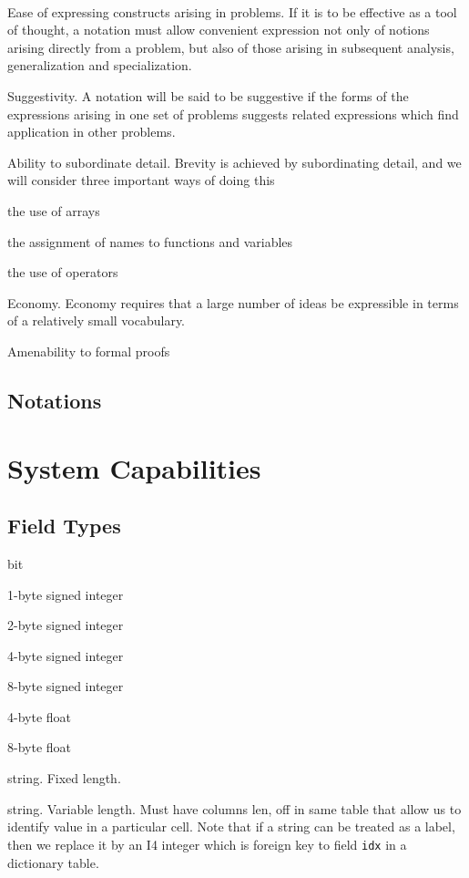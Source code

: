 {\tt 
\be
\item Ease of expressing constructs arising in problems. If it is to be
effective as a tool of thought, a notation must allow convenient
expression not only of notions arising directly from a problem, but also
of those arising in subsequent analysis, generalization and
specialization.

\item Suggestivity. A notation will be said to be suggestive if the
forms of the expressions arising in one set of problems suggests related
expressions which find application in other problems.

\item Ability to subordinate detail. Brevity is achieved by
subordinating detail, and we will consider three important ways of doing
this
\bi
\item the use of arrays
\item the assignment of names to functions and variables
\item the use of operators
\ei

\item Economy. Economy requires that a large number of ideas be
expressible in terms of a relatively small vocabulary. 

\item Amenability to formal proofs

\ee
}


\subsection{Notations}


\section{System Capabilities}

\subsection{Field Types}
\label{Field_Types}
\bd
\item [B]  bit 
\item [I1] 1-byte signed integer
\item [I2] 2-byte signed integer
\item [I4] 4-byte signed integer
\item [I8] 8-byte signed integer
\item [F4] 4-byte float
\item [F8] 8-byte float
\item [SC]  string. Fixed length.
\item [SV]  string. Variable length. Must have columns len, off in same
table that allow us to identify value in a particular cell.
\ed
Note that if a string can be treated as a label, then we replace it
by an I4 integer which is foreign key to field {\tt idx} in a dictionary table. 

